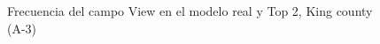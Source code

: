 \begin{figure}[H]
    \centering
    
    \caption{Frecuencia del campo View en el modelo real y Top 2, King county (A-3)}
    \label{frecuency-top2-view}
\end{figure}